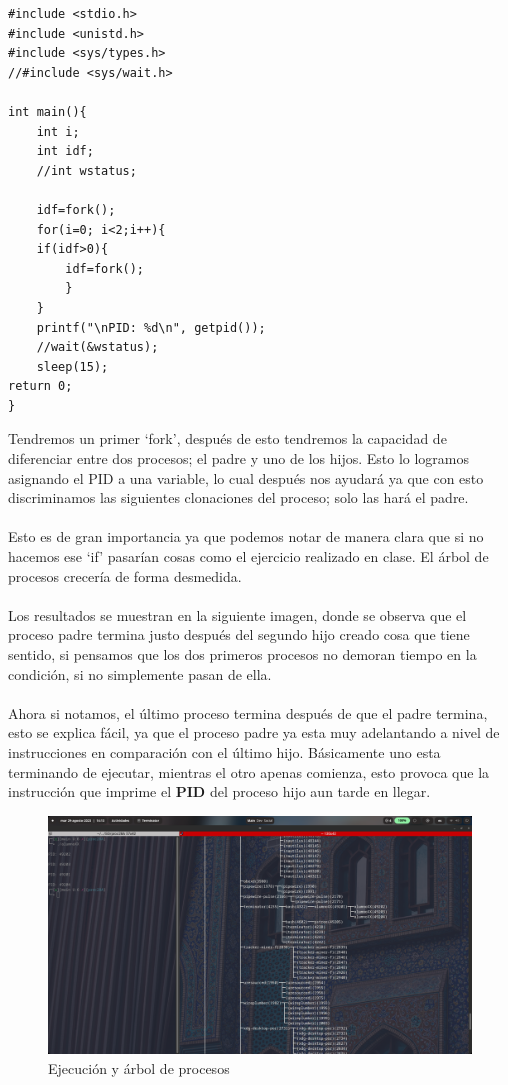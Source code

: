 \documentclass[11pt]{article}
\begin{document}
\begin{lstlisting}
#include <stdio.h>
#include <unistd.h>
#include <sys/types.h>
//#include <sys/wait.h>

int main(){
    int i;
    int idf;
    //int wstatus;

    idf=fork();
    for(i=0; i<2;i++){
	if(idf>0){
		idf=fork();
    	}
    }
    printf("\nPID: %d\n", getpid());
    //wait(&wstatus);
    sleep(15);
return 0;
}
\end{lstlisting}
Tendremos un primer ‘fork’, después de esto tendremos la capacidad de diferenciar entre dos procesos; el padre y uno de los hijos. Esto lo logramos asignando el PID a una variable, lo cual después nos ayudará ya que con esto discriminamos las siguientes clonaciones del proceso; solo las hará el padre. 
\\\\
Esto es de gran importancia ya que podemos notar de manera clara que si no hacemos ese ‘if’ pasarían cosas como el ejercicio realizado en clase. El árbol de procesos crecería de forma desmedida.
\\\\
Los resultados se muestran en la siguiente imagen, donde se observa que el proceso padre termina justo después del segundo hijo creado cosa que tiene sentido, si pensamos que los dos primeros procesos no demoran tiempo en la condición, si no simplemente pasan de ella. 
\\\\
Ahora si notamos, el último proceso termina después de que el padre termina, esto se explica fácil, ya que el proceso padre ya esta muy adelantando a nivel de instrucciones en comparación con el último hijo. Básicamente uno esta terminando de ejecutar, mientras el otro apenas comienza, esto provoca que la instrucción que imprime el \textbf{PID} del proceso hijo aun tarde en llegar. 
\begin{figure}
  \includegraphics[width=\linewidth]{p6.png}
  \caption{Ejecución y árbol de procesos}
  \label{img:p6}
\end{figure}
\end{document}
